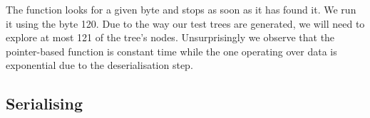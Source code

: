 The  function looks for a given byte and stops
as soon as it has found it. We run it using the byte 120.
%
Due to the way our test trees are generated, we will need to explore
at most 121 of the tree's nodes.
%
Unsurprisingly we observe that the pointer-based function is
constant time while the one operating over data is exponential
due to the deserialisation step.

\noindent
\begin{minipage}{.5\textwidth}
\end{minipage}\hfill
\begin{minipage}{.45\textwidth}
\end{minipage}



\subsection{Serialising}

\noindent
\begin{minipage}{.5\textwidth}
\end{minipage}\hfill
\begin{minipage}{.45\textwidth}
\end{minipage}

\noindent
\begin{minipage}{.5\textwidth}
\end{minipage}\hfill
\begin{minipage}{.45\textwidth}
\end{minipage}
